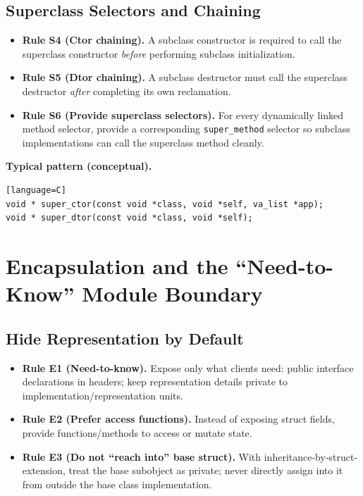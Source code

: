 \documentclass[11pt]{article}
\begin{document}
\subsection{Superclass Selectors and Chaining}

\begin{itemize}
  \item \textbf{Rule S4 (Ctor chaining).} A subclass constructor is required to call the superclass constructor \emph{before} performing subclass initialization.
  \item \textbf{Rule S5 (Dtor chaining).} A subclass destructor must call the superclass destructor \emph{after} completing its own reclamation.
  \item \textbf{Rule S6 (Provide superclass selectors).} For every dynamically linked method selector, provide a corresponding \texttt{super\_method} selector so subclass implementations can call the superclass method cleanly.
\end{itemize}

\noindent\textbf{Typical pattern (conceptual).}
\begin{verbatim}[language=C]
void * super_ctor(const void *class, void *self, va_list *app);
void * super_dtor(const void *class, void *self);
\end{verbatim}

\section{Encapsulation and the ``Need-to-Know'' Module Boundary}

\subsection{Hide Representation by Default}

\begin{itemize}
  \item \textbf{Rule E1 (Need-to-know).} Expose only what clients need: public interface declarations in headers; keep representation details private to implementation/representation units.
  \item \textbf{Rule E2 (Prefer access functions).} Instead of exposing struct fields, provide functions/methods to access or mutate state.
  \item \textbf{Rule E3 (Do not ``reach into'' base struct).} With inheritance-by-struct-extension, treat the base subobject as private; never directly assign into it from outside the base class implementation.
\end{itemize}
\end{document}
